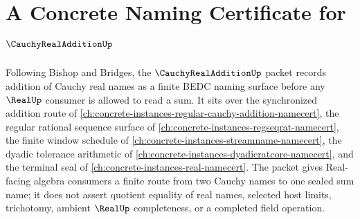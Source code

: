 \chapter{A Concrete Naming Certificate for $\CauchyRealAdditionUp$}
\label{ch:concrete-instances-cauchy-real-addition-namecert}

Following Bishop and Bridges, the $\CauchyRealAdditionUp$ packet records addition of Cauchy real names as a finite BEDC naming surface before any $\RealUp$ consumer is allowed to read a sum. It sits over the synchronized addition route of \autoref{ch:concrete-instances-regular-cauchy-addition-namecert}, the regular rational sequence surface of \autoref{ch:concrete-instances-regseqrat-namecert}, the finite window schedule of \autoref{ch:concrete-instances-streamname-namecert}, the dyadic tolerance arithmetic of \autoref{ch:concrete-instances-dyadicratcore-namecert}, and the terminal seal of \autoref{ch:concrete-instances-real-namecert}. The packet gives Real-facing algebra consumers a finite route from two Cauchy names to one sealed sum name; it does not assert quotient equality of real names, selected host limits, trichotomy, ambient $\RealUp$ completeness, or a completed field operation.

